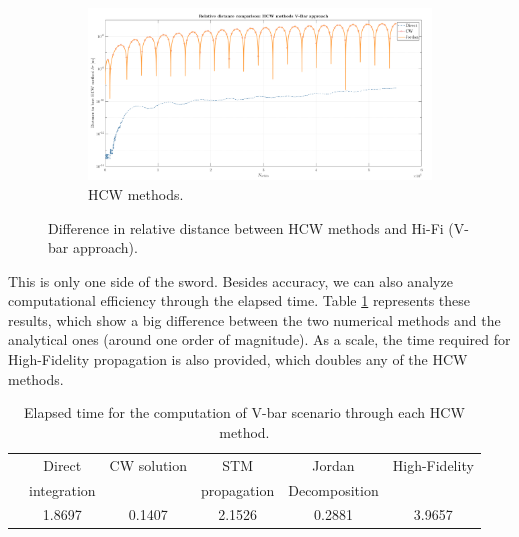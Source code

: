 		\begin{figure}[!htb]
		\ContinuedFloat
		\begin{subfigure}[t]{.8\linewidth}
		\begin{changemargin}{-2.2cm}{-1cm}
		\begin{adjustbox}{width=1.2\textwidth}
		\centering\includegraphics[width = \linewidth]{Chapters/Chapter_02/dr_comp_HCW_V_bar_approach}
		\end{adjustbox}
		\end{changemargin}
		\caption{HCW methods.}
		\label{figCh2:dr_comp_HCW_V_bar_approach}
		\end{subfigure}
		
		\caption{Difference in relative distance between HCW methods and Hi-Fi (V-bar approach).}
		\end{figure}
		\indent This is only one side of the sword. Besides accuracy, we can also analyze computational efficiency through the elapsed time. Table \ref{tabCh2:HCW_Vbar} represents these results, which show a big difference between the two numerical methods and the analytical ones (around one order of magnitude). As a scale, the time required for High-Fidelity propagation is also provided, which doubles any of the HCW methods.
		\begin{table}[!htb]
		\centering
		\begin{tabular}{|c|c|c|c|c||c|}
		\hline 
		\rowcolor{Gray!10}
		\multirow{2}{*}{\textbf{Method}} 	& Direct 		& CW solution 	& STM 			& Jordan  			& High-Fidelity \\ 
		\rowcolor{Gray!10}
											& integration 	&   				& propagation 	&  Decomposition 	&  \\ 
		\hline 
		\ccg{\textbf{Elapsed time} [$s$]} & 1.8697 & 0.1407 & 2.1526 & 0.2881 & 3.9657 \\ 
		\hline 
		\end{tabular} 
		\caption{Elapsed time for the computation of V-bar scenario through each HCW method.}
		\label{tabCh2:HCW_Vbar}
		\end{table}
